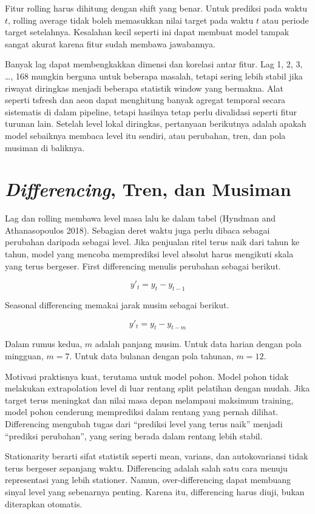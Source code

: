 Fitur rolling harus dihitung dengan shift yang benar. Untuk prediksi pada waktu \(t\), rolling average tidak boleh memasukkan nilai target pada waktu \(t\) atau periode target setelahnya. Kesalahan kecil seperti ini dapat membuat model tampak sangat akurat karena fitur sudah membawa jawabannya.

Banyak lag dapat membengkakkan dimensi dan korelasi antar fitur. Lag 1, 2, 3, \ldots, 168 mungkin berguna untuk beberapa masalah, tetapi sering lebih stabil jika riwayat diringkas menjadi beberapa statistik window yang bermakna. Alat seperti tsfresh dan aeon dapat menghitung banyak agregat temporal secara sistematis di dalam pipeline, tetapi hasilnya tetap perlu divalidasi seperti fitur turunan lain. Setelah level lokal diringkas, pertanyaan berikutnya adalah apakah model sebaiknya membaca level itu sendiri, atau perubahan, tren, dan pola musiman di baliknya.

\section{\texorpdfstring{\emph{Differencing}, Tren, dan Musiman}{Differencing, Tren, dan Musiman}}\label{differencing-tren-dan-musiman}

Lag dan rolling membawa level masa lalu ke dalam tabel (Hyndman and Athanasopoulos 2018). Sebagian deret waktu juga perlu dibaca sebagai perubahan daripada sebagai level. Jika penjualan ritel terus naik dari tahun ke tahun, model yang mencoba memprediksi level absolut harus mengikuti skala yang terus bergeser. First differencing menulis perubahan sebagai berikut.

\[
y'_t = y_t - y_{t-1}
\]

Seasonal differencing memakai jarak musim sebagai berikut.

\[
y'_t = y_t - y_{t-m}
\]

Dalam rumus kedua, \(m\) adalah panjang musim. Untuk data harian dengan pola mingguan, \(m = 7\). Untuk data bulanan dengan pola tahunan, \(m = 12\).

Motivasi praktisnya kuat, terutama untuk model pohon. Model pohon tidak melakukan extrapolation level di luar rentang split pelatihan dengan mudah. Jika target terus meningkat dan nilai masa depan melampaui maksimum training, model pohon cenderung memprediksi dalam rentang yang pernah dilihat. Differencing mengubah tugas dari ``prediksi level yang terus naik'' menjadi ``prediksi perubahan'', yang sering berada dalam rentang lebih stabil.

Stationarity berarti sifat statistik seperti mean, varians, dan autokovariansi tidak terus bergeser sepanjang waktu. Differencing adalah salah satu cara menuju representasi yang lebih stationer. Namun, over-differencing dapat membuang sinyal level yang sebenarnya penting. Karena itu, differencing harus diuji, bukan diterapkan otomatis.

